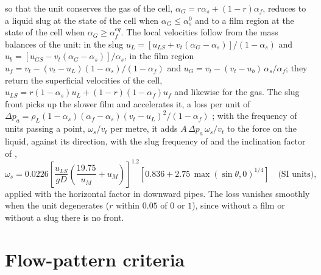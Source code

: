 \documentclass[a4paper,fleqn]{cas-sc}
\newcommand{\aG}{\alpha_G}
\begin{document}
so that the unit conserves the gas of the cell, $\aG = r\alpha_s + (1 - r)\alpha_f$, reduces to a liquid slug at the state of the cell when $\aG \le \alpha_s^0$ and to a film region at the state of the cell when $\aG \ge \alpha_f^{eq}$. The local velocities follow from the mass balances of the unit: in the slug $u_L = [u_{LS} + v_t(\aG - \alpha_s)]/(1 - \alpha_s)$ and $u_b = [u_{GS} - v_t(\aG - \alpha_s)]/\alpha_s$, in the film region $u_f = v_t - (v_t - u_L)(1 - \alpha_s)/(1 - \alpha_f)$ and $u_G = v_t - (v_t - u_b)\,\alpha_s/\alpha_f$; they return the superficial velocities of the cell, $u_{LS} = r(1 - \alpha_s)u_L + (1 - r)(1 - \alpha_f)u_f$ and likewise for the gas. The slug front picks up the slower film and accelerates it, a loss per unit of $\Delta p_a = \rho_L(1 - \alpha_s)(\alpha_f - \alpha_s)(v_t - u_L)^2/(1 - \alpha_f)$ \citep{taitel1990b}; with the frequency of units passing a point, $\omega_s/v_t$ per metre, it adds $A\,\Delta p_a\,\omega_s/v_t$ to the force on the liquid, against its direction, with the slug frequency of \citet{gregory1969} and the inclination factor of \citet{zabaras2000},
\begin{equation}\label{eq:zabaras}
\omega_s = 0.0226\left[\frac{u_{LS}}{gD}\left(\frac{19.75}{u_M} + u_M\right)\right]^{1.2}\left[0.836 + 2.75\,\max(\sin\theta, 0)^{1/4}\right] \quad\text{(SI units)},
\end{equation}
applied with the horizontal factor in downward pipes. The loss vanishes smoothly when the unit degenerates ($r$ within $0.05$ of $0$ or $1$), since without a film or without a slug there is no front.

\section{Flow-pattern criteria}\label{app:patterns}
\setcounter{equation}{0}\setcounter{table}{0}\setcounter{figure}{0}
\end{document}
